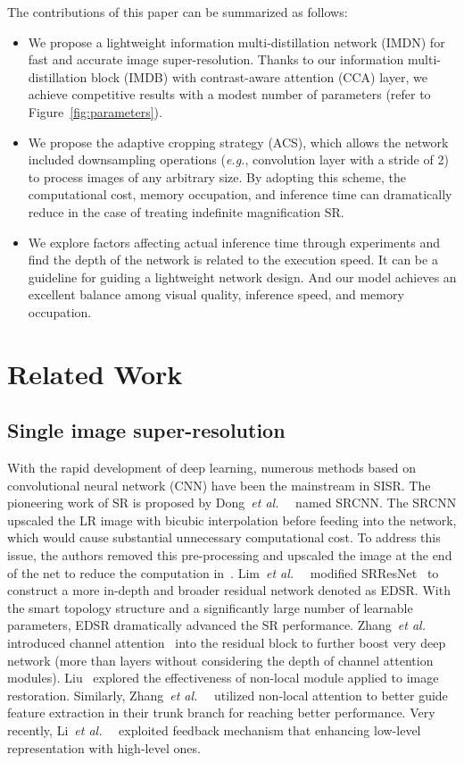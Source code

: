 \documentclass[sigconf]{acmart}
\newcommand{\etal}{\emph{et al.}~}
\newcommand{\eg}{\emph{e.g.}}
\begin{document}
The contributions of this paper can be summarized as follows:
\begin{itemize}
	\item We propose a lightweight information multi-distillation network (IMDN) for fast and accurate image super-resolution. Thanks to our information multi-distillation block (IMDB) with contrast-aware attention (CCA) layer, we achieve competitive results with a modest number of parameters (refer to Figure~\ref{fig:parameters}).
	
	\item We propose the adaptive cropping strategy (ACS), which allows the network included downsampling operations (\eg, convolution layer with a stride of 2) to process images of any arbitrary size. By adopting this scheme, the computational cost, memory occupation, and inference time can dramatically reduce in the case of treating indefinite magnification SR.
	
	\item We explore factors affecting actual inference time through experiments and find the depth of the network is related to the execution speed. It can be a guideline for guiding a lightweight network design. And our model achieves an excellent balance among visual quality, inference speed, and memory occupation.
\end{itemize}
\section{Related Work}\label{sec:related-work}
\subsection{Single image super-resolution}
With the rapid development of deep learning, numerous methods based on convolutional neural network (CNN) have been the mainstream in SISR. The pioneering work of SR is proposed by Dong~\etal~\cite{SRCNN,SRCNN-Ex} named SRCNN. The SRCNN upscaled the LR image with bicubic interpolation before feeding into the network, which would cause substantial unnecessary computational cost. To address this issue, the authors removed this pre-processing and upscaled the image at the end of the net to reduce the computation in~\cite{FSRCNN}. Lim~\etal~\cite{EDSR} modified SRResNet~\cite{SRGAN} to construct a more in-depth and broader residual network denoted as EDSR. With the smart topology structure and a significantly large number of learnable parameters, EDSR dramatically advanced the SR performance. Zhang~\etal~\cite{RDN} introduced channel attention~\cite{SENet} into the residual block to further boost very deep network (more than  layers without considering the depth of channel attention modules). Liu~\cite{NLRN} explored the effectiveness of non-local module applied to image restoration. Similarly, Zhang~\etal~\cite{RNAN} utilized non-local attention to better guide feature extraction in their trunk branch for reaching better performance. Very recently, Li~\etal~\cite{feedbackSR} exploited feedback mechanism that enhancing low-level representation with high-level ones. 
\end{document}
